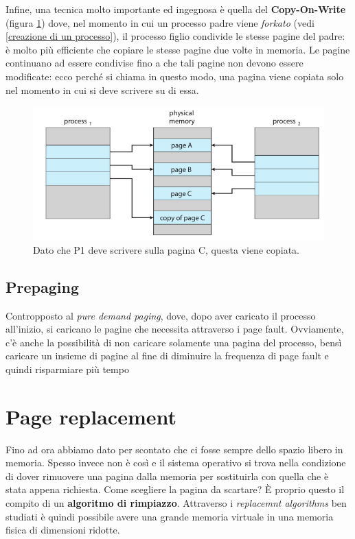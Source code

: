 Infine, una tecnica molto importante ed ingegnosa è quella del \textbf{Copy-On-Write} (figura \ref{fig:copy_on_write}) dove, nel momento in cui un processo padre viene \textit{forkato} (vedi \ref{creazione di un processo}), il processo figlio condivide le stesse pagine del padre: è molto più efficiente che copiare le stesse pagine due volte in memoria. Le pagine continuano ad essere condivise fino a che tali pagine non devono essere modificate: ecco perché si chiama in questo modo, una pagina viene copiata solo nel momento in cui si deve scrivere su di essa. 
\begin{figure}[h]
    \centering
    \includegraphics[width = .6\textwidth]{../res/imgs/virtual memory/copy_on_write.png}
    \caption{Dato che P1 deve scrivere sulla pagina C, questa viene copiata.}
    \label{fig:copy_on_write}
\end{figure}

% 
\subsection{Prepaging}
Contropposto al \textit{pure demand paging}, dove, dopo aver caricato il processo all'inizio, si caricano le pagine che necessita attraverso i page fault. Ovviamente, c'è anche la possibilità di non caricare solamente una pagina del processo, bensì caricare un insieme di pagine al fine di diminuire la frequenza di page fault e quindi risparmiare più tempo 



% 
\section{Page replacement}\label{page replacement}
Fino ad ora abbiamo dato per scontato che ci fosse sempre dello spazio libero in memoria. Spesso invece non è così e il sistema operativo si trova nella condizione di dover rimuovere una pagina dalla memoria per sostituirla con quella che è stata appena richiesta. Come scegliere la pagina da scartare? È proprio questo il compito di un \textbf{algoritmo di rimpiazzo}. Attraverso i \textit{replacemnt algorithms} ben studiati è quindi possibile avere una grande memoria virtuale in una memoria fisica di dimensioni ridotte.

